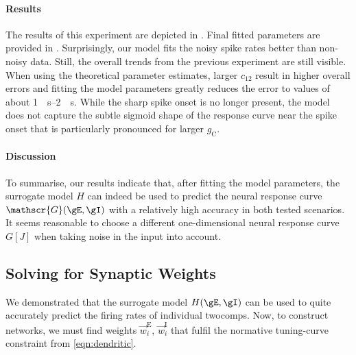 \paragraph{Results}
The results of this experiment are depicted in .
Final fitted parameters are provided in .
Surprisingly, our model fits the noisy spike rates better than non-noisy data.
Still, the overall trends from the previous experiment are still visible.
When using the theoretical parameter estimates, larger $c_{12}$ result in higher overall errors and fitting the model parameters greatly reduces the error to values of about \SIrange{1}{2}{\per\second}.
While the sharp spike onset is no longer present, the model does not capture the subtle sigmoid shape of the response curve near the spike onset that is particularly pronounced for larger $g_\mathrm{C}$.

\paragraph{Discussion}
To summarise, our results indicate that, after fitting the model parameters, the surrogate model $H$ can indeed be used to predict the neural response curve $\mathscr{G}(\gE, \gI)$ with a relatively high accuracy in both tested scenarios.
It seems reasonable to choose a different one-dimensional neural response curve $G[J]$ when taking noise in the input into account.


\subsection{Solving for Synaptic Weights}
\label{sec:two_comp_synaptic_weights}

We demonstrated that the surrogate model $H(\gE, \gI)$ can be used to quite accurately predict the firing rates of individual \glspl{twocomp}.
Now, to construct \NEF networks, we must find weights $\vec w^\mathrm{E}_i$, $\vec w^\mathrm{I}_i$ that fulfil the normative tuning-curve constraint from \cref{eqn:dendritic}.


